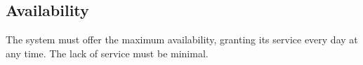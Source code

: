 \documentclass[../../../rasd.tex]{subfiles}
\begin{document}
\subsection{Availability\label{sect:3.5.2}}

The system must offer the maximum availability, granting its service every day at any time. The lack of service must be minimal. 
\end{document}
